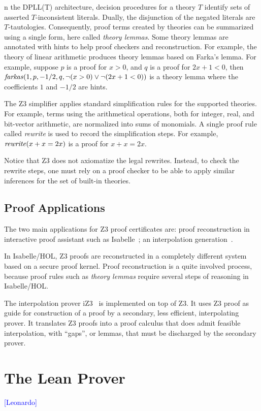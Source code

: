\documentclass{llncs}
\newcommand{\Note}[1]{\textcolor{blue}{[#1]}}
\begin{document}
n the DPLL(T) architecture, decision procedures for a theory $T$
identify sets of asserted $T$-inconsistent literals. Dually, the
disjunction of the negated literals are $T$-tautologies. Consequently,
proof terms created by theories can be summarized using a single form,
here called \emph{theory lemmas}. Some theory lemmas are annotated
with hints to help proof checkers and reconstruction. For example, the
theory of linear arithmetic produces theory lemmas based on Farka's
lemma. For example, suppose $p$ is a proof for $x > 0$, and $q$ is a
proof for $2x + 1 < 0$, then $\mbox{\emph{farkas}}(1, p, -1/2, q, \neg(x > 0) \vee \neg(2x + 1 < 0))$
is a theory lemma where the coefficients $1$ and $-1/2$ are hints.

The Z3 simplifier applies standard simplification rules for the
supported theories. For example, terms using the arithmetical operations,
both for integer, real, and bit-vector arithmetic, are normalized into sums of monomials.
A single proof rule called \emph{rewrite} is used to record the simplification steps.
For example, $\mbox{\emph{rewrite}}(x + x = 2 x)$ is a proof for $x + x = 2x$.

Notice that Z3 does not axiomatize the legal rewrites.
Instead, to check the rewrite steps, one must rely on a
proof checker to be able to apply similar inferences for the set of built-in theories.

\subsection{Proof Applications}

The two main applications for Z3 proof certificates are: proof
reconstruction in interactive proof assistant such as
Isabelle~\cite{IsabelleZ3}; an interpolation generation~\cite{iZ3}.

In Isabelle/HOL, Z3 proofs are reconstructed in a completely different
system based on a secure proof kernel. Proof reconstruction is a quite
involved process, because proof rules such as \emph{theory lemmas} require
several steps of reasoning in Isabelle/HOL.

The interpolation prover iZ3~\cite{iZ3} is implemented on top of Z3.  It uses Z3
proof as guide for construction of a proof by a secondary, less
efficient, interpolating prover. It translates Z3 proofs into
a proof calculus that does admit feasible interpolation, with
``gaps'', or lemmas, that must be discharged by the secondary prover.


\section{The Lean Prover}
\Note{Leonardo}
\end{document}
